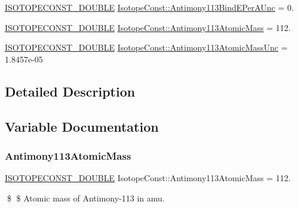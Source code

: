 \begin{DoxyCompactItemize}
\mbox{\hyperlink{group___isotope_const-_macros_ga8f45a7272ce02c0b4c65c44636ed719a}{I\+S\+O\+T\+O\+P\+E\+C\+O\+N\+S\+T\+\_\+\+D\+O\+U\+B\+LE}} \mbox{\hyperlink{group___isotope_const-_antimony-_sb113_gaeeb0f25ea894aef5d79586d40c458218}{Isotope\+Const\+::\+Antimony113\+Bind\+E\+Per\+A\+Unc}} = 0.
\item 
\mbox{\hyperlink{group___isotope_const-_macros_ga8f45a7272ce02c0b4c65c44636ed719a}{I\+S\+O\+T\+O\+P\+E\+C\+O\+N\+S\+T\+\_\+\+D\+O\+U\+B\+LE}} \mbox{\hyperlink{group___isotope_const-_antimony-_sb113_gaff8b240567f2580871dc2c8946095434}{Isotope\+Const\+::\+Antimony113\+Atomic\+Mass}} = 112.
\item 
\mbox{\hyperlink{group___isotope_const-_macros_ga8f45a7272ce02c0b4c65c44636ed719a}{I\+S\+O\+T\+O\+P\+E\+C\+O\+N\+S\+T\+\_\+\+D\+O\+U\+B\+LE}} \mbox{\hyperlink{group___isotope_const-_antimony-_sb113_ga41eed45ace39442d28d12a36fa262ab1}{Isotope\+Const\+::\+Antimony113\+Atomic\+Mass\+Unc}} = 1.\+8457e-\/05
\end{DoxyCompactItemize}


\subsection{Detailed Description}


\subsection{Variable Documentation}
\mbox{\label{group___isotope_const-_antimony-_sb113_gaff8b240567f2580871dc2c8946095434}} 
\subsubsection{\texorpdfstring{Antimony113\+Atomic\+Mass}{Antimony113AtomicMass}}
{\footnotesize\ttfamily \mbox{\hyperlink{group___isotope_const-_macros_ga8f45a7272ce02c0b4c65c44636ed719a}{I\+S\+O\+T\+O\+P\+E\+C\+O\+N\+S\+T\+\_\+\+D\+O\+U\+B\+LE}} Isotope\+Const\+::\+Antimony113\+Atomic\+Mass = 112.}

\$ \$ Atomic mass of Antimony-\/113 in amu. \mbox{\label{group___isotope_const-_antimony-_sb113_ga41eed45ace39442d28d12a36fa262ab1}} 
